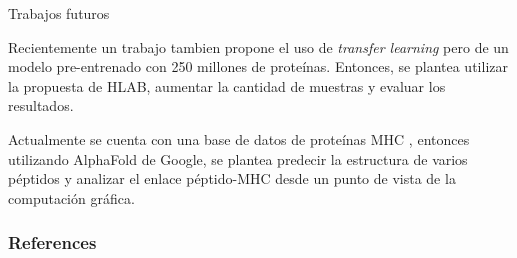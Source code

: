 \documentclass[10pt]{beamer}
\newcommand{\1}{
	\setbeamertemplate{background}{
		\texttt{[image: img/1]}
		\tikz[overlay] \fill[fill opacity=0.75,fill=white] (0,0) rectangle (-\paperwidth,\paperheight);
	}
}
\begin{document}

\begin{frame}{Trabajos futuros}{}
	\begin{block}{}
		Recientemente un trabajo \cite{hashemi2022improved} tambien propone el uso de \textit{transfer learning} pero de un modelo pre-entrenado con 250 millones de proteínas. Entonces, se plantea utilizar la propuesta de HLAB, aumentar la cantidad de muestras y evaluar los resultados.
	\end{block}
	
	\begin{block}{}
		Actualmente se cuenta con una base de datos de proteínas MHC \cite{e2019phla3d}, entonces utilizando AlphaFold de Google, se plantea predecir la estructura de varios péptidos y analizar el enlace péptido-MHC desde un punto de vista de la computación gráfica.	
	\end{block}
	
	
\end{frame}

\begin{frame}[allowframebreaks]
	\frametitle{References}
	
	
\end{frame}
\end{document}
